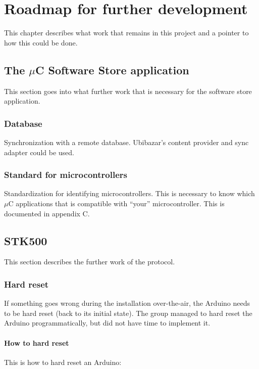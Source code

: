 \chapter{Roadmap for further development}
This chapter describes what work that remains in this project and a pointer to how this could be done.

\section{The $\mu$C Software Store application}
This section goes into what further work that is necessary for the software store application.

	\subsection{Database}
	Synchronization with a remote database. Ubibazar's content provider and sync adapter could be used.

	\subsection{Standard for microcontrollers}
	Standardization for identifying microcontrollers. This is necessary to know which $\mu$C applications that is compatible with ``your'' microcontroller. This is documented in appendix C.

\section{STK500}
This section describes the further work of the protocol.

	\subsection{Hard reset}
	If something goes wrong during the installation over-the-air, the Arduino needs to be hard reset (back to its initial state).
	The group managed to hard reset the Arduino programmatically, but did not have time to implement it.

		\subsubsection{How to hard reset}
		This is how to hard reset an Arduino: